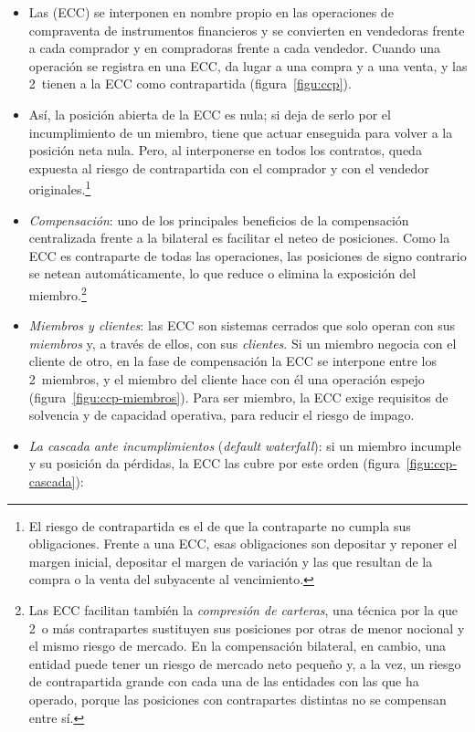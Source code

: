 \documentclass[11pt]{article}
\begin{document}
\begin{itemize}
\item Las  (ECC) se interponen en nombre propio en las operaciones de compraventa de instrumentos financieros y se convierten en vendedoras frente a cada comprador y en compradoras frente a cada vendedor. Cuando una operación se registra en una ECC, da lugar a una compra y a una venta, y las 2~tienen a la ECC como contrapartida (figura~\ref{figu:ccp})\nocite{NunezValdeolivas2019CCP,Gregory2014Central}.
\item Así, la posición abierta de la ECC es nula; si deja de serlo por el incumplimiento de un miembro, tiene que actuar enseguida para volver a la posición neta nula. Pero, al interponerse en todos los contratos, queda expuesta al riesgo de contrapartida con el comprador y con el vendedor originales.\footnote{El riesgo de contrapartida es el de que la contraparte no cumpla sus obligaciones. Frente a una ECC, esas obligaciones son depositar y reponer el margen inicial, depositar el margen de variación y las que resultan de la compra o la venta del subyacente al vencimiento.}
\item \emph{Compensación}: uno de los principales beneficios de la compensación centralizada frente a la bilateral es facilitar el neteo de posiciones. Como la ECC es contraparte de todas las operaciones, las posiciones de signo contrario se netean automáticamente, lo que reduce o elimina la exposición del miembro.\footnote{Las ECC facilitan también la \emph{compresión de carteras}, una técnica por la que 2~o más contrapartes sustituyen sus posiciones por otras de menor nocional y el mismo riesgo de mercado. En la compensación bilateral, en cambio, una entidad puede tener un riesgo de mercado neto pequeño y, a la vez, un riesgo de contrapartida grande con cada una de las entidades con las que ha operado, porque las posiciones con contrapartes distintas no se compensan entre sí.}
\item \emph{Miembros y clientes}: las ECC son sistemas cerrados que solo operan con sus \emph{miembros} y, a través de ellos, con sus \emph{clientes}. Si un miembro negocia con el cliente de otro, en la fase de compensación la ECC se interpone entre los 2~miembros, y el miembro del cliente hace con él una operación espejo (figura~\ref{figu:ccp-miembros}). Para ser miembro, la ECC exige requisitos de solvencia y de capacidad operativa, para reducir el riesgo de impago.
\item \emph{La cascada ante incumplimientos} (\emph{default waterfall}): si un miembro incumple y su posición da pérdidas, la ECC las cubre por este orden (figura~\ref{figu:ccp-cascada}):

\end{itemize}
\end{document}

